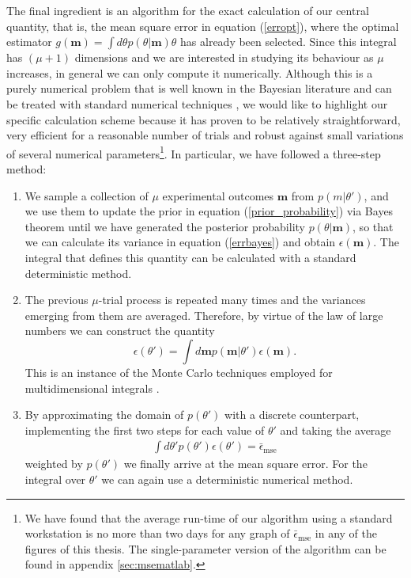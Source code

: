 The final ingredient is an algorithm for the exact calculation of our central quantity, that is, the mean square error in equation (\ref{erropt}), where the optimal estimator $g(\boldsymbol{m}) = \int d\theta p(\theta|\boldsymbol{m})\theta$ has already been selected. Since this integral has $(\mu+1)$ dimensions and we are interested in studying its behaviour as $\mu$ increases, in general we can only compute it numerically. Although this is a purely numerical problem that is well known in the Bayesian literature \cite{jaynes2003, rafal2015} and can be treated with standard numerical techniques \cite{mathematics2004, numerics2014matlab}, we would like to highlight our specific calculation scheme because it has proven to be relatively straightforward, very efficient for a reasonable number of trials and robust against small variations of several numerical parameters\footnote{We have found that the average run-time of our algorithm using a standard workstation is no more than two days for any graph of $\bar{\epsilon}_{\mathrm{mse}}$ in any of the figures of this thesis. The single-parameter version of the algorithm can be found in appendix \ref{sec:msematlab}.}. In particular, we have followed a three-step method:
\begin{enumerate}
\item We sample a collection of $\mu$ experimental outcomes $\boldsymbol{m}$ from $p(m|\theta')$, and we use them to update the prior in equation (\ref{prior_probability}) via Bayes theorem until we have generated the posterior probability  $p(\theta|\boldsymbol{m})$, so that we can calculate its variance in equation (\ref{errbayes}) and obtain $\epsilon(\boldsymbol{m})$. The integral that defines this quantity can be calculated with a standard deterministic method. 

\item The previous $\mu$-trial process is repeated many times and the variances emerging from them are averaged. Therefore, by virtue of the law of large numbers we can construct the quantity
\begin{equation}
\epsilon(\theta') = \int d\boldsymbol{m}p(\boldsymbol{m}|\theta')\epsilon(\boldsymbol{m}).
\label{simulation}
\end{equation}
This is an instance of the Monte Carlo techniques employed for multidimensional integrals \cite{mathematics2004, numerics2014matlab}. 

\item By approximating the domain of $p(\theta')$ with a discrete counterpart, implementing the first two steps for each value of $\theta'$ and taking the average 
\begin{eqnarray}
\int d\theta' p(\theta')\epsilon(\theta')=\bar{\epsilon}_{\mathrm{mse}}
\label{finalmse}
\end{eqnarray}
weighted by $p(\theta')$ we finally arrive at the mean square error. For the integral over $\theta'$ we can again use a deterministic numerical method.
\end{enumerate}

